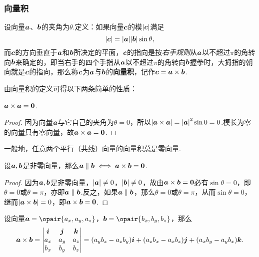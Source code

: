 \subsubsection{向量积}
\begin{definition}
设向量\(\boldsymbol{a}\)、\(\boldsymbol{b}\)的夹角为\(\theta\).定义：如果向量\(\boldsymbol{c}\)的模\(\abs{\boldsymbol{c}}\)满足\begin{equation}
\abs{\boldsymbol{c}} = \abs{\boldsymbol{a}}\abs{\boldsymbol{b}}\sin\theta,
\end{equation}而\(\boldsymbol{c}\)的方向垂直于\(\boldsymbol{a}\)和\(\boldsymbol{b}\)所决定的平面，\(\boldsymbol{c}\)的指向是按\emph{右手规则}从\(\boldsymbol{a}\)以不超过\(\pi\)的角转向\(\boldsymbol{b}\)来确定的，即当右手的四个手指从\(\boldsymbol{a}\)以不超过\(\pi\)的角转向\(\boldsymbol{b}\)握拳时，大拇指的朝向就是\(\boldsymbol{c}\)的指向，那么称\(\boldsymbol{c}\)为\(\boldsymbol{a}\)与\(\boldsymbol{b}\)的\textbf{向量积}，记作\(\boldsymbol{c}=\boldsymbol{a}\times\boldsymbol{b}\).
\end{definition}

由向量积的定义可得以下两条简单的性质：
\begin{property}
\(\boldsymbol{a}\times\boldsymbol{a} = \boldsymbol{0}\).
\begin{proof}
因为向量\(\boldsymbol{a}\)与它自己的夹角为\(\theta=0\)，所以\(\abs{\boldsymbol{a}\times\boldsymbol{a}} = \abs{\boldsymbol{a}}^2 \sin0 = 0\).模长为零的向量只有零向量，故\(\boldsymbol{a}\times\boldsymbol{a} = \boldsymbol{0}\).
\end{proof}
\end{property}
一般地，任意两个平行（共线）向量的向量积总是零向量.

\begin{property}
设\(\boldsymbol{a},\boldsymbol{b}\)是非零向量，那么\(\boldsymbol{a}\parallel\boldsymbol{b} \iff \boldsymbol{a}\times\boldsymbol{b} = \boldsymbol{0}\).
\begin{proof}
因为\(\boldsymbol{a},\boldsymbol{b}\)是非零向量，\(\abs{\boldsymbol{a}}\neq0\)，\(\abs{\boldsymbol{b}}\neq0\)，故由\(\boldsymbol{a}\times\boldsymbol{b} = \boldsymbol{0}\)必有\(\sin\theta=0\)，即\(\theta=0\)或\(\theta=\pi\)，亦即\(\boldsymbol{a}\parallel\boldsymbol{b}\).反之，如果\(\boldsymbol{a}\parallel\boldsymbol{b}\)，那么\(\theta=0\)或\(\theta=\pi\)，从而\(\sin\theta=0\)，继而\(\abs{\boldsymbol{a}\times\boldsymbol{b}}=0\)，即\(\boldsymbol{a}\times\boldsymbol{b}=\boldsymbol{0}\).
\end{proof}
\end{property}

\begin{theorem}
设向量\(\mat{a}=\opair{a_x,a_y,a_z}\)，\(\mat{b}=\opair{b_x,b_y,b_z}\)，那么\begin{equation}
\boldsymbol{a}\times\boldsymbol{b} = \begin{vmatrix}
\boldsymbol{i} & \boldsymbol{j} & \boldsymbol{k} \\
a_x & a_y & a_z \\
b_x & b_y & b_z
\end{vmatrix}
= (a_y b_z - a_z b_y) \boldsymbol{i}
	+ (a_z b_x - a_x b_z) \boldsymbol{j}
	+ (a_x b_y - a_y b_x) \boldsymbol{k}.
\end{equation}
\end{theorem}

